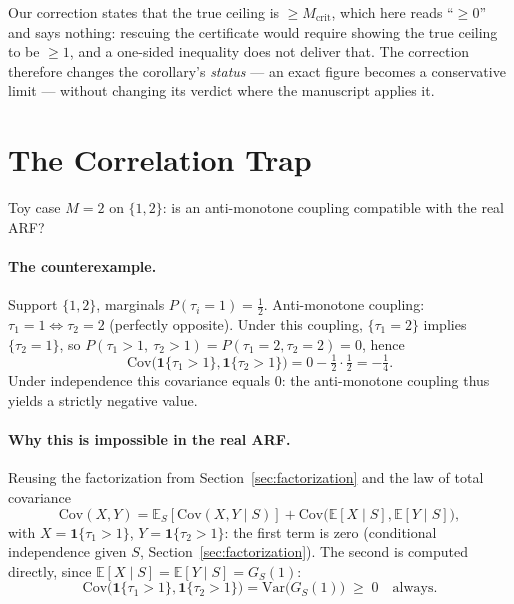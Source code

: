 \documentclass[11pt,a4paper]{article}
\begin{document}
Our correction states that the true ceiling is $\ge M_{\mathrm{crit}}$, which here reads
``$\ge 0$'' and says nothing: rescuing the certificate would require showing the true
ceiling to be $\ge 1$, and a one-sided inequality does not deliver that. The correction
therefore changes the corollary's \emph{status} --- an exact figure becomes a conservative
limit --- without changing its verdict where the manuscript applies it.

\section{The Correlation Trap}

Toy case $M=2$ on $\{1,2\}$: is an anti-monotone coupling compatible with the real
ARF?

\paragraph{The counterexample.} Support $\{1,2\}$, marginals $P(\tau_i=1)=\tfrac12$.
Anti-monotone coupling: $\tau_1=1 \iff \tau_2=2$ (perfectly opposite). Under this
coupling, $\{\tau_1=2\}$ implies $\{\tau_2=1\}$, so
$P(\tau_1{>}1,\ \tau_2{>}1)=P(\tau_1{=}2,\tau_2{=}2)=0$, hence
\[
  \mathrm{Cov}\big(\mathbf{1}\{\tau_1{>}1\},\mathbf{1}\{\tau_2{>}1\}\big) = 0 - \tfrac12\cdot\tfrac12 = -\tfrac14.
\]
Under independence this covariance equals $0$: the anti-monotone coupling thus yields
a strictly negative value.

\paragraph{Why this is impossible in the real ARF.} Reusing the factorization from
Section~\ref{sec:factorization} and the law of total covariance
\[
  \mathrm{Cov}(X,Y) = \mathbb{E}_S[\mathrm{Cov}(X,Y\mid S)] +
  \mathrm{Cov}\big(\mathbb{E}[X\mid S],\mathbb{E}[Y\mid S]\big),
\]
with $X=\mathbf{1}\{\tau_1{>}1\}$, $Y=\mathbf{1}\{\tau_2{>}1\}$: the first term is zero
(conditional independence given $S$, Section~\ref{sec:factorization}). The second is computed directly,
since $\mathbb{E}[X\mid S]=\mathbb{E}[Y\mid S]=G_S(1)$:
\[
  \mathrm{Cov}\big(\mathbf{1}\{\tau_1{>}1\},\mathbf{1}\{\tau_2{>}1\}\big) = \mathrm{Var}\big(G_S(1)\big) \;\ge\; 0 \quad \text{always}.
\]

\begin{center}
\end{center}
\end{document}
